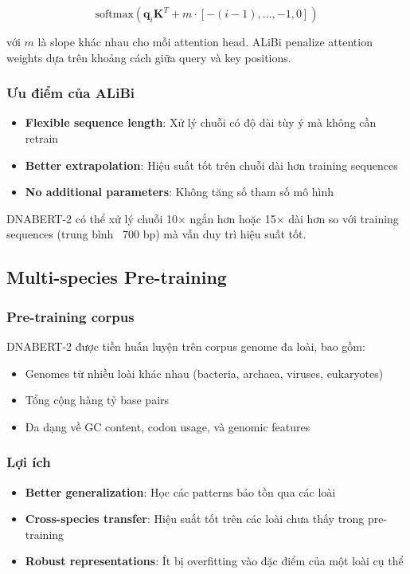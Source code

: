 \begin{equation}
\text{softmax}\left(\mathbf{q}_i \mathbf{K}^T + m \cdot [-(i-1), \ldots, -1, 0]\right)
\end{equation}

với $m$ là slope khác nhau cho mỗi attention head. ALiBi penalize attention weights dựa trên khoảng cách giữa query và key positions.

\subsubsection{Ưu điểm của ALiBi}

\begin{itemize}
    \item \textbf{Flexible sequence length}: Xử lý chuỗi có độ dài tùy ý mà không cần retrain
    \item \textbf{Better extrapolation}: Hiệu suất tốt trên chuỗi dài hơn training sequences
    \item \textbf{No additional parameters}: Không tăng số tham số mô hình
\end{itemize}

DNABERT-2 có thể xử lý chuỗi 10× ngắn hơn hoặc 15× dài hơn so với training sequences (trung bình ~700 bp) mà vẫn duy trì hiệu suất tốt.

\subsection{Multi-species Pre-training}

\subsubsection{Pre-training corpus}

DNABERT-2 được tiền huấn luyện trên corpus genome đa loài, bao gồm:
\begin{itemize}
    \item Genomes từ nhiều loài khác nhau (bacteria, archaea, viruses, eukaryotes)
    \item Tổng cộng hàng tỷ base pairs
    \item Đa dạng về GC content, codon usage, và genomic features
\end{itemize}

\subsubsection{Lợi ích}

\begin{itemize}
    \item \textbf{Better generalization}: Học các patterns bảo tồn qua các loài
    \item \textbf{Cross-species transfer}: Hiệu suất tốt trên các loài chưa thấy trong pre-training
    \item \textbf{Robust representations}: Ít bị overfitting vào đặc điểm của một loài cụ thể
\end{itemize}


